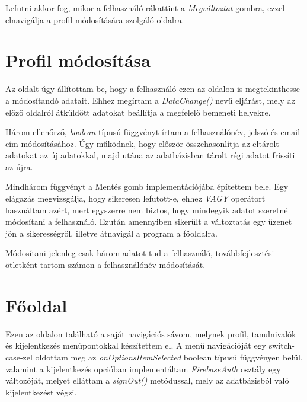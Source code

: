 \documentclass{thesis-ekf}
\begin{document}
Lefutni akkor fog, mikor a felhasználó rákattint a \textit{Megváltoztat} gombra, ezzel elnavigálja a profil módosítására szolgáló oldalra.

\section{Profil módosítása}
Az oldalt úgy állítottam be, hogy a felhasználó ezen az oldalon is megtekinthesse a módosítandó adatait. Ehhez megírtam a \textit{DataChange()} nevű eljárást, mely az előző oldalról átküldött adatokat beállítja a megfelelő bemeneti helyekre.

Három ellenőrző, \textit{boolean} típusú függvényt írtam a felhasználónév, jelszó és email cím módosításához. Úgy működnek, hogy először összehasonlítja az eltárolt adatokat az új adatokkal, majd utána az adatbázisban tárolt régi adatot frissíti az újra. 

Mindhárom függvényt a Mentés gomb implementációjába építettem bele. Egy elágazás megvizsgálja, hogy sikeresen lefutott-e, ehhez \textit{VAGY} operátort használtam azért, mert egyszerre nem biztos, hogy mindegyik adatot szeretné módosítani a felhasználó. Ezután amennyiben sikerült a változtatás egy üzenet jön a sikerességről, illetve átnavigál a program a főoldalra.

\renewcommand{\lstlistingname}{kód}


Módosítani jelenleg csak három adatot tud a felhasználó, továbbfejlesztési ötletként tartom számon a felhasználónév módosítását.

\section{Főoldal}
Ezen az oldalon található a saját navigációs sávom, melynek profil, tanulnivalók és kijelentkezés menüpontokkal készítettem el. A menü navigációját egy switch-case-zel oldottam meg az \textit{onOptionsItemSelected} boolean típusú függvényen belül, valamint a kijelentkezés opcióban implementáltam \textit{FirebaseAuth} osztály egy változóját, melyet elláttam a \textit{signOut()} metódussal, mely az adatbázisból való kijelentkezést végzi.
\end{document}
